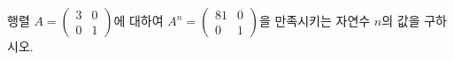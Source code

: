 \hspace*{2mm}\begin{minipage}[t]{\dimexpr\linewidth-2mm\relax}\vspace{0pt}
행렬 $A=\begin{pmatrix} 3 & 0 \\ 0 & 1 \end{pmatrix}$에 대하여 $A^n=\begin{pmatrix} 81 & 0 \\ 0 & 1 \end{pmatrix}$을 만족시키는 자연수 $n$의 값을 구하시오.\end{minipage}
